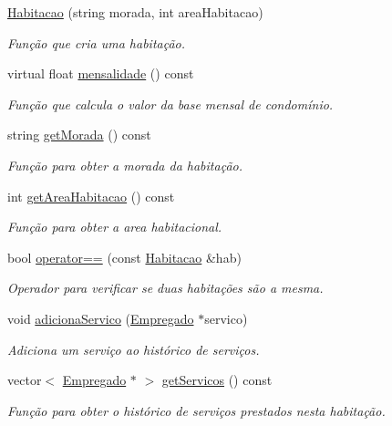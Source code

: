 \begin{DoxyCompactItemize}
\item 
\hyperlink{class_habitacao_a3b5e5edb0ca3b52025ef46a796fcf18d}{Habitacao} (string morada, int area\+Habitacao)
\begin{DoxyCompactList}\small\item\em Função que cria uma habitação. \end{DoxyCompactList}\item 
virtual float \hyperlink{class_habitacao_a479d2307661c87b05242b86ba849fb6e}{mensalidade} () const 
\begin{DoxyCompactList}\small\item\em Função que calcula o valor da base mensal de condomínio. \end{DoxyCompactList}\item 
string \hyperlink{class_habitacao_a17ef78eef7746f92bd2814893bfafbab}{get\+Morada} () const 
\begin{DoxyCompactList}\small\item\em Função para obter a morada da habitação. \end{DoxyCompactList}\item 
int \hyperlink{class_habitacao_a8b8dc61b41f3bda37f3e517fe63f877a}{get\+Area\+Habitacao} () const 
\begin{DoxyCompactList}\small\item\em Função para obter a area habitacional. \end{DoxyCompactList}\item 
bool \hyperlink{class_habitacao_acd290b8d83f41d4667867d5dc353166e}{operator==} (const \hyperlink{class_habitacao}{Habitacao} \&hab)
\begin{DoxyCompactList}\small\item\em Operador para verificar se duas habitações são a mesma. \end{DoxyCompactList}\item 
void \hyperlink{class_habitacao_a2a8c7343f36b0d9415aef14b09bca511}{adiciona\+Servico} (\hyperlink{class_empregado}{Empregado} $\ast$servico)
\begin{DoxyCompactList}\small\item\em Adiciona um serviço ao histórico de serviços. \end{DoxyCompactList}\item 
vector$<$ \hyperlink{class_empregado}{Empregado} $\ast$ $>$ \hyperlink{class_habitacao_ae157cbc24ee34cd97c48eb6c114804e9}{get\+Servicos} () const 
\begin{DoxyCompactList}\small\item\em Função para obter o histórico de serviços prestados nesta habitação. \end{DoxyCompactList}\end{DoxyCompactItemize}


